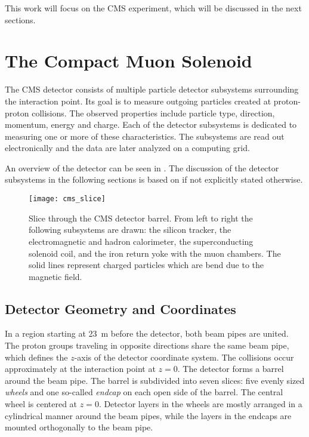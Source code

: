 This work will focus on the \ac{CMS} experiment, which will be discussed in the next sections.

\section{The Compact Muon Solenoid}
The \ac{CMS} detector consists of multiple particle detector subsystems surrounding the interaction point.
Its goal is to measure outgoing particles created at proton-proton collisions.
The observed properties include particle type, direction, momentum, energy and charge. Each of the detector subsystems is dedicated to measuring one or more of these characteristics. The subsystems are read out electronically and the data are later analyzed on a computing grid.

An overview of the detector can be seen in . The discussion of the detector subsystems in the following sections is based on \cite{Chatrchyan:CMSexperimentCERN} if not explicitly stated otherwise.

\begin{figure}
    \centering
    \hspace{0.02\textwidth}
    \texttt{[image: cms\_slice]}
    \caption{Slice through the CMS detector barrel. From left to right the following subsystems are drawn: the silicon tracker, the electromagnetic and hadron calorimeter, the superconducting solenoid coil, and the iron return yoke with the muon chambers. The solid lines represent charged particles which are bend due to the magnetic field\cite[modified]{Davis:CMSSlice}.}
    \label{fig:CMS_slice}
\end{figure}

\subsection{Detector Geometry and Coordinates}
In a region starting at \SI{23}{\m} before the detector, both beam pipes are united\cite{Evans:LHCMachine}. The proton groups traveling in opposite directions share the same beam pipe, which defines the $z$-axis of the detector coordinate system. The collisions occur approximately at the interaction point at $z = 0$.
The detector forms a barrel around the beam pipe. The barrel is subdivided into seven slices: five evenly sized \emph{wheels} and one so-called \emph{endcap} on each open side of the barrel. The central wheel is centered at $z = 0$.
Detector layers in the wheels are mostly arranged in a cylindrical manner around the beam pipes, while the layers in the endcaps are mounted orthogonally to the beam pipe.

